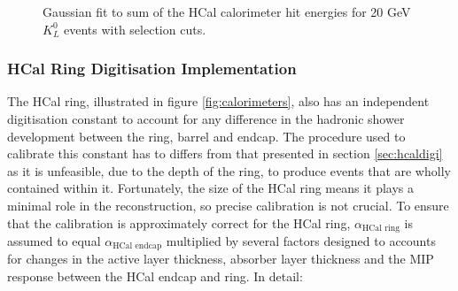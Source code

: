 \begin{figure}[h!]
\caption[Gaussian fit to sum of the HCal calorimeter hit energies for 20 GeV $K^{0}_{L}$ events with selection cuts.]{Gaussian fit to sum of the HCal calorimeter hit energies for 20 GeV $K^{0}_{L}$ events with selection cuts.}
\label{fig:hcaldigifit}
\end{figure}


\subsubsection{HCal Ring Digitisation Implementation}
\label{sec:hcalringdigi}
The HCal ring, illustrated in figure \ref{fig:calorimeters}, also has an independent digitisation constant to account for any difference in the hadronic shower development between the ring, barrel and endcap.  The procedure used to calibrate this constant has to differs from that presented in section \ref{sec:hcaldigi} as it is unfeasible, due to the depth of the ring, to produce events that are wholly contained within it.  Fortunately, the size of the HCal ring means it plays a minimal role in the reconstruction, so precise calibration is not crucial.  To ensure that the calibration is approximately correct for the HCal ring, $\alpha_{\text{HCal ring}}$ is assumed to equal $\alpha_{\text{HCal endcap}}$ multiplied by several factors designed to accounts for changes in the active layer thickness, absorber layer thickness and the MIP response between the HCal endcap and ring.  In detail:

